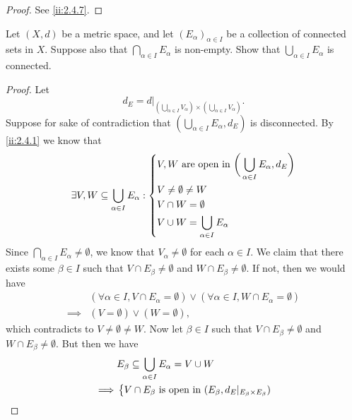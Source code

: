 \begin{proof}
  See \cref{ii:2.4.7}.
\end{proof}

\begin{ex}\label{ii:ex:2.4.6}
  Let \((X, d)\) be a metric space, and let \((E_\alpha)_{\alpha \in I}\) be a collection of connected sets in \(X\).
  Suppose also that \(\bigcap_{\alpha \in I} E_\alpha\) is non-empty.
  Show that \(\bigcup_{\alpha \in I} E_\alpha\) is connected.
\end{ex}

\begin{proof}
  Let
  \[
    d_E = d|_{(\bigcup_{\alpha \in I} V_\alpha) \times (\bigcup_{\alpha \in I} V_\alpha)}.
  \]
  Suppose for sake of contradiction that \((\bigcup_{\alpha \in I} E_\alpha, d_E)\) is disconnected.
  By \cref{ii:2.4.1} we know that
  \[
    \exists V, W \subseteq \bigcup_{\alpha \in I} E_\alpha : \begin{dcases}
      V, W \text{ are open in } \bigg(\bigcup_{\alpha \in I} E_\alpha, d_E\bigg) \\
      V \neq \emptyset \neq W                                                    \\
      V \cap W = \emptyset                                                       \\
      V \cup W = \bigcup_{\alpha \in I} E_\alpha
    \end{dcases}
  \]
  Since \(\bigcap_{\alpha \in I} E_\alpha \neq \emptyset\), we know that \(V_\alpha \neq \emptyset\) for each \(\alpha \in I\).
  We claim that there exists some \(\beta \in I\) such that \(V \cap E_\beta \neq \emptyset\) and \(W \cap E_\beta \neq \emptyset\).
  If not, then we would have
  \begin{align*}
             & (\forall \alpha \in I, V \cap E_\alpha = \emptyset) \lor (\forall \alpha \in I, W \cap E_\alpha = \emptyset) \\
    \implies & (V = \emptyset) \lor (W = \emptyset),
  \end{align*}
  which contradicts to \(V \neq \emptyset \neq W\).
  Now let \(\beta \in I\) such that \(V \cap E_\beta \neq \emptyset\) and \(W \cap E_\beta \neq \emptyset\).
  But then we have
  \begin{align*}
             & E_\beta \subseteq \bigcup_{\alpha \in I} E_\alpha = V \cup W                                      \\
    \implies & \begin{dcases}
                 V \cap E_\beta \text{ is open in } (E_\beta, d_E|_{E_\beta \times E_\beta}) \\

\end{dcases}
\end{align*}
\end{proof}
